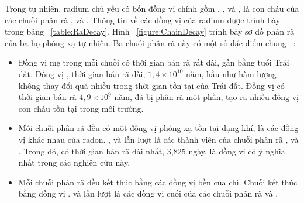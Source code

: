 
Trong tự nhiên, radium chủ yếu có bốn đồng vị chính gồm , ,  và , là con cháu của các chuỗi phân rã ,  và . Thông tin về các đồng vị của radium được trình bày trong bảng ~\ref{table:RaDecay}. Hình ~\ref{figure:ChainDecay} trình bày sơ đồ phân rã của ba họ phóng xạ tự nhiên. Ba chuỗi phân rã này có một số đặc điểm chung  ~\cite{Thesis:HNPThu}:  

\begin{itemize}
    \item Đồng vị mẹ trong mỗi chuỗi có thời gian bán rã rất dài, gần bằng tuổi Trái đất. Đồng vị , thời gian bán rã dài, $1,4 \times 10^{10}$ năm, hầu như hàm lượng không thay đổi quá nhiều trong thời gian tồn tại của Trái đất. Đồng vị  có thời gian bán rã $4,9 \times 10^9$ năm, đã bị phân rã một phần, tạo ra nhiều đồng vị con cháu tồn tại trong môi trường.
    \item Mỗi chuỗi phân rã đều có một đồng vị phóng xạ tồn tại dạng khí, là các đồng vị khác nhau của radon. ,  và  lần lượt là các thành viên của chuỗi phân rã ,  và . Trong đó,  có thời gian bán rã dài nhất, 3,825 ngày, là đồng vị có ý nghĩa nhất trong các nghiên cứu này.  
    \item  Mỗi chuỗi phân rã đều kết thúc bằng các đồng vị bền của chì. Chuỗi  kết thúc bằng đồng vị .  và  lần lượt là các đồng vị cuối của các chuỗi phân rã  và .
\end{itemize}


